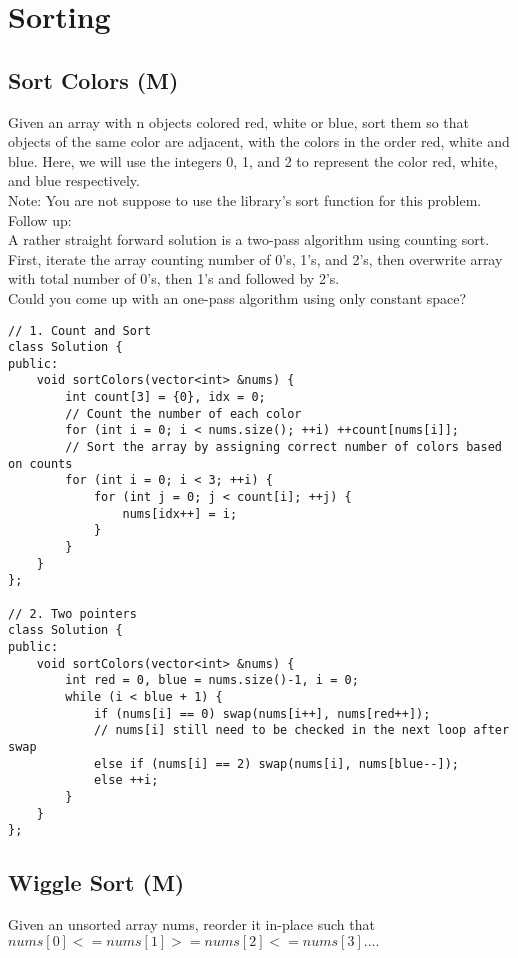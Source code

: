 \chapter{Sorting}
\section{Sort Colors (M)}
Given an array with n objects colored red, white or blue, sort them so that objects of the same color are adjacent, with the colors in the order red, white and blue. Here, we will use the integers 0, 1, and 2 to represent the color red, white, and blue respectively.\\

Note: You are not suppose to use the library's sort function for this problem.\\

Follow up:\\
A rather straight forward solution is a two-pass algorithm using counting sort.\\
First, iterate the array counting number of 0's, 1's, and 2's, then overwrite array with total number of 0's, then 1's and followed by 2's.\\
Could you come up with an one-pass algorithm using only constant space?\\

\begin{lstlisting}
// 1. Count and Sort
class Solution {
public:
    void sortColors(vector<int> &nums) {
        int count[3] = {0}, idx = 0;
        // Count the number of each color
        for (int i = 0; i < nums.size(); ++i) ++count[nums[i]];
        // Sort the array by assigning correct number of colors based on counts
        for (int i = 0; i < 3; ++i) {
            for (int j = 0; j < count[i]; ++j) {
                nums[idx++] = i;
            }
        }
    }
};

// 2. Two pointers
class Solution {
public:
    void sortColors(vector<int> &nums) {
        int red = 0, blue = nums.size()-1, i = 0;
        while (i < blue + 1) {
            if (nums[i] == 0) swap(nums[i++], nums[red++]);
            // nums[i] still need to be checked in the next loop after swap
            else if (nums[i] == 2) swap(nums[i], nums[blue--]);
            else ++i;
        }
    }
};
\end{lstlisting}


\section{Wiggle Sort (M)}
Given an unsorted array nums, reorder it in-place such that $nums[0] <= nums[1] >= nums[2] <= nums[3]....$\\

